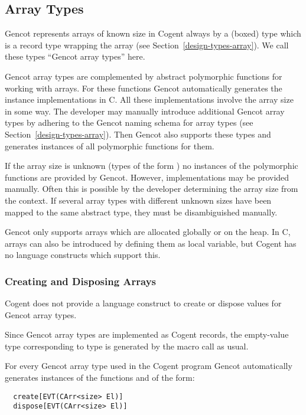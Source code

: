 \subsection{Array Types}
\label{design-operations-array}

Gencot represents arrays of known size in Cogent always by a (boxed) type  which is a record 
type wrapping the array (see Section~\ref{design-types-array}).
We call these types ``Gencot array types'' here.

Gencot array types are complemented by abstract polymorphic functions for working with
arrays. For these functions Gencot automatically generates the instance 
implementations in C. All these implementations involve the array size in some way. The developer may manually introduce
additional Gencot array types by adhering to the Gencot naming schema for array types (see Section~\ref{design-types-array}). 
Then Gencot also supports these types and generates instances of all polymorphic functions for them.

If the array size is unknown (types of the form )
no instances of the polymorphic functions are provided by Gencot. However, implementations may be provided manually. Often
this is possible by the developer determining the array size from the context. If several array types with 
different unknown sizes have been mapped to the same abstract type, they must be disambiguished manually.

Gencot only supports arrays which are allocated globally or on the heap. In C, arrays can also be introduced by defining
them as local variable, but Cogent has no language constructs which support this.

\subsubsection{Creating and Disposing Arrays}

Cogent does not provide a language construct to create or dispose values for Gencot array types.

Since Gencot array types are implemented as Cogent records, the empty-value type corresponding to type  
is generated by the macro call  as 
usual.

For every Gencot array type  used in the Cogent program Gencot automatically
generates instances of the functions  and  of the form:
\begin{verbatim}
  create[EVT(CArr<size> El)]
  dispose[EVT(CArr<size> El)]
\end{verbatim}

